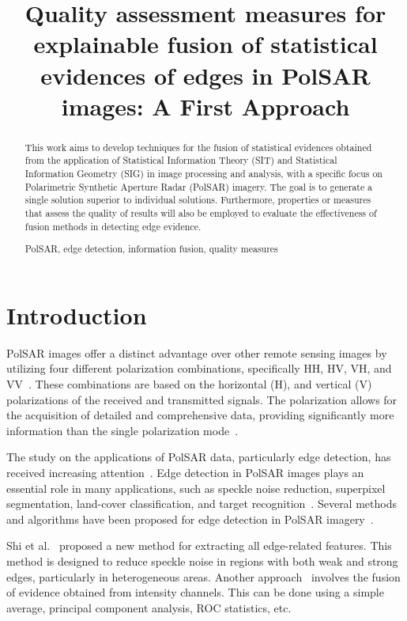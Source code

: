 \documentclass{article}
\title{Quality assessment measures for explainable fusion of statistical evidences of edges in PolSAR images: A First Approach}
\begin{document}
%
\maketitle
%
\begin{abstract}
This work aims to develop techniques for the fusion of statistical evidences obtained from the application of Statistical Information Theory (SIT) and Statistical Information Geometry (SIG) in image processing and analysis, with a specific focus on Polarimetric Synthetic Aperture Radar (PolSAR) imagery. The goal is to generate a single solution superior to individual solutions. Furthermore, properties or measures that assess the quality of results will also be employed to evaluate the effectiveness of fusion methods in detecting edge evidence.

%
\begin{keywords}
PolSAR, edge detection,  information fusion,  quality
measures 
\end{keywords}
%
\end{abstract}
\section{Introduction}
PolSAR images offer a distinct advantage over other remote sensing images by utilizing four different polarization combinations, specifically HH, HV, VH, and VV~\cite{Hua2022}. These combinations are based on the horizontal (H), and vertical (V) polarizations of the received and transmitted signals. The polarization allows for the acquisition of detailed and comprehensive data, providing significantly more information than the single polarization mode~\cite{Zhai2015}.

The study on the applications of PolSAR data, particularly edge detection, has received increasing attention~\cite{Jin2016,Wang2018}. Edge detection in PolSAR images plays an essential role in many applications, such as speckle noise reduction, superpixel segmentation, land-cover classification, and target recognition~\cite{Xiang2016}. 
Several methods and algorithms have been proposed for edge detection in PolSAR imagery~\cite{Schou2003,Gambini2007,Nascimento2014}. 

Shi et al.~\cite{Shi2020} proposed a new method for extracting all edge-related features. 
This method is designed to reduce speckle noise in regions with both weak and strong edges, particularly in heterogeneous areas. 
Another approach~\cite{DeBorba2020} involves the fusion of evidence obtained from intensity channels. 
This can be done using a simple average, principal component analysis, ROC statistics, etc.
\end{document}
